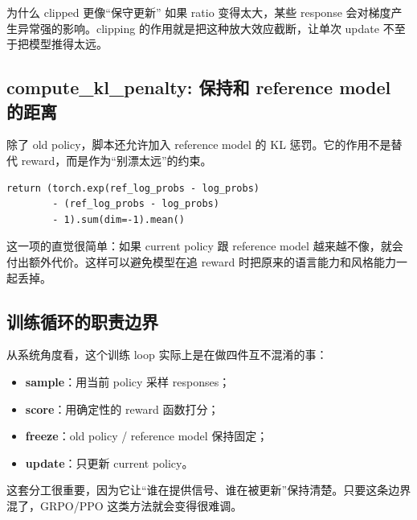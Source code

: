 \begin{warningbox}{为什么 clipped 更像“保守更新”}
如果 ratio 变得太大，某些 response 会对梯度产生异常强的影响。clipping 的作用就是把这种放大效应截断，让单次 update 不至于把模型推得太远。
\end{warningbox}

\subsection{compute\_kl\_penalty: 保持和 reference model 的距离}

除了 old policy，脚本还允许加入 reference model 的 KL 惩罚。它的作用不是替代 reward，而是作为“别漂太远”的约束。

\begin{lstlisting}[caption={compute\_kl\_penalty}]
return (torch.exp(ref_log_probs - log_probs)
        - (ref_log_probs - log_probs)
        - 1).sum(dim=-1).mean()
\end{lstlisting}

这一项的直觉很简单：如果 current policy 跟 reference model 越来越不像，就会付出额外代价。这样可以避免模型在追 reward 时把原来的语言能力和风格能力一起丢掉。


\subsection{训练循环的职责边界}

从系统角度看，这个训练 loop 实际上是在做四件互不混淆的事：
\begin{itemize}
    \item \textbf{sample}：用当前 policy 采样 responses；
    \item \textbf{score}：用确定性的 reward 函数打分；
    \item \textbf{freeze}：old policy / reference model 保持固定；
    \item \textbf{update}：只更新 current policy。
\end{itemize}

这套分工很重要，因为它让“谁在提供信号、谁在被更新”保持清楚。只要这条边界混了，GRPO/PPO 这类方法就会变得很难调。

